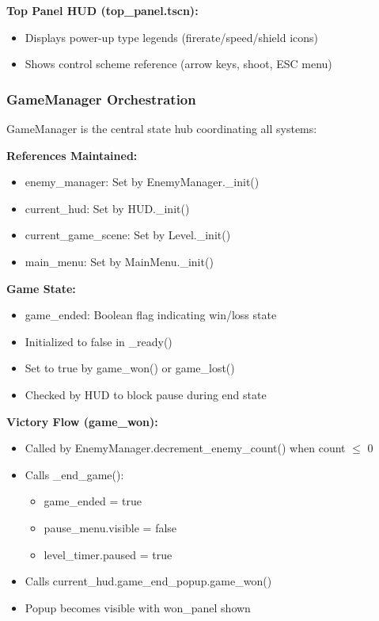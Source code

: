 \documentclass{article}
\begin{document}
\textbf{Top Panel HUD (top\_panel.tscn):}
\begin{itemize}
    \item Displays power-up type legends (firerate/speed/shield icons)
    \item Shows control scheme reference (arrow keys, shoot, ESC menu)
\end{itemize}

\subsubsection{GameManager Orchestration}

GameManager is the central state hub coordinating all systems:

\textbf{References Maintained:}
\begin{itemize}
    \item enemy\_manager: Set by EnemyManager.\_init()
    \item current\_hud: Set by HUD.\_init()
    \item current\_game\_scene: Set by Level.\_init()
    \item main\_menu: Set by MainMenu.\_init()
\end{itemize}

\textbf{Game State:}
\begin{itemize}
    \item game\_ended: Boolean flag indicating win/loss state
    \item Initialized to false in \_ready()
    \item Set to true by game\_won() or game\_lost()
    \item Checked by HUD to block pause during end state
\end{itemize}

\textbf{Victory Flow (game\_won):}
\begin{itemize}
    \item Called by EnemyManager.decrement\_enemy\_count() when count $\leq$ 0
    \item Calls \_end\_game():
    \begin{itemize}
        \item game\_ended = true
        \item pause\_menu.visible = false
        \item level\_timer.paused = true
    \end{itemize}
    \item Calls current\_hud.game\_end\_popup.game\_won()
    \item Popup becomes visible with won\_panel shown
\end{itemize}
\end{document}
